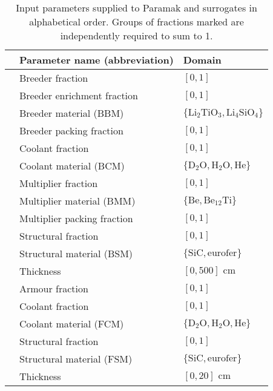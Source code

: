 \begin{table}[t]
	\setlength\tabcolsep{2pt}
	\renewcommand{\arraystretch}{0.95}
	\caption{\label{tbl:params}Input parameters supplied to Paramak and surrogates in alphabetical order. Groups of fractions marked\textsuperscript{\textdagger
		\textdaggerdbl} are independently required to sum to 1.}
	\begin{indented}
	\item[]
		\begin{tabular}{l|ll}
		\toprule
		{} & Parameter name (abbreviation) & Domain\\
		\midrule
		\parbox[t]{2mm}{\hspace{-2pt}}
		   & Breeder fraction\textsuperscript{\textdagger} & $[0,1]$\\
		   & Breeder  enrichment fraction & $[0,1]$\\
		   & Breeder material (BBM) & $\{\text{Li}_2\text{TiO}_3, \text{Li}_4\text{SiO}_4\}$\\
		   & Breeder packing fraction & $[0,1]$\\
		   & Coolant fraction\textsuperscript{\textdagger} & $[0,1]$\\
		   & Coolant material (BCM) & $\{\text{D}_2\text{O}, \text{H}_2\text{O}, \text{He}\}$\\
		   & Multiplier fraction\textsuperscript{\textdagger} & $[0,1]$\\
		   & Multiplier material (BMM) & $\{\text{Be}, \text{Be}_{12}\text{Ti}\}$\\
		   & Multiplier packing fraction & $[0,1]$\\
		   & Structural fraction\textsuperscript{\textdagger} & $[0,1]$\\
		   & Structural material (BSM) & $\{\text{SiC}, \text{eurofer}\}$\\
		   & Thickness & $[0,500]\text{ cm}$\\
		\midrule
		\parbox[t]{2mm}{\hspace{-2pt}}
		   & Armour fraction\textsuperscript{\textdaggerdbl} & $[0,1]$\\
		   & Coolant fraction\textsuperscript{\textdaggerdbl} & $[0,1]$\\
		   & Coolant material (FCM) & $\{\text{D}_2\text{O}, \text{H}_2\text{O}, \text{He}\}$\\
		   & Structural fraction\textsuperscript{\textdaggerdbl} & $[0,1]$\\
		   & Structural material (FSM) & $\{\text{SiC}, \text{eurofer}\}$\\
		   & Thickness & $[0,20]\text{ cm}$\\
		\bottomrule
		\end{tabular}
	\end{indented}
\end{table}

